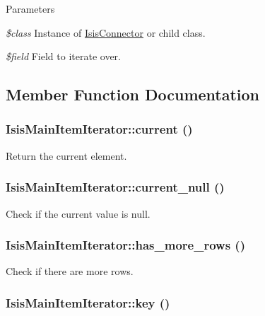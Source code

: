 \begin{DoxyParams}{Parameters}
\item[{\em \$class}]Instance of \hyperlink{classIsisConnector}{IsisConnector} or child class.\item[{\em \$field}]Field to iterate over. \end{DoxyParams}


\subsection{Member Function Documentation}
\hypertarget{classIsisMainItemIterator_adab612db1a4e1f16c6bc5848c3d4ee21}{
\subsubsection[{current}]{\setlength{\rightskip}{0pt plus 5cm}IsisMainItemIterator::current ()}}
\label{classIsisMainItemIterator_adab612db1a4e1f16c6bc5848c3d4ee21}
Return the current element. \hypertarget{classIsisMainItemIterator_ad0f3d297912d5101d5227139f8414c80}{
\subsubsection[{current\_\-null}]{\setlength{\rightskip}{0pt plus 5cm}IsisMainItemIterator::current\_\-null ()}}
\label{classIsisMainItemIterator_ad0f3d297912d5101d5227139f8414c80}
Check if the current value is null. \hypertarget{classIsisMainItemIterator_a6c406f34a89316ff7e7fa15a80806b39}{
\subsubsection[{has\_\-more\_\-rows}]{\setlength{\rightskip}{0pt plus 5cm}IsisMainItemIterator::has\_\-more\_\-rows ()}}
\label{classIsisMainItemIterator_a6c406f34a89316ff7e7fa15a80806b39}
Check if there are more rows. \hypertarget{classIsisMainItemIterator_a3676fc993eb38641c65363f2e05873f3}{
\subsubsection[{key}]{\setlength{\rightskip}{0pt plus 5cm}IsisMainItemIterator::key ()}}
